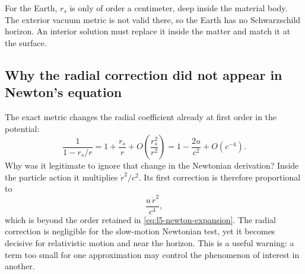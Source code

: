 \begin{classroomqa}
\end{classroomqa}

\begin{classroomqa}
\end{classroomqa}

For the Earth, \(r_s\) is only of order a centimeter, deep inside the material
body.  The exterior vacuum metric is not valid there, so the Earth has no
Schwarzschild horizon.  An interior solution must replace it inside the
matter and match it at the surface.

\begin{classroomqa}
\end{classroomqa}

\subsection{Why the radial correction did not appear in Newton's equation}

The exact metric changes the radial coefficient already at first order in the
potential:
\begin{equation}
\frac{1}{1-r_s/r}
=1+\frac{r_s}{r}
+O\!\left(\frac{r_s^2}{r^2}\right)
=1-\frac{2u}{c^2}+O(c^{-4}).
\label{eq:l5-radial-expansion}
\end{equation}
Why was it legitimate to ignore that change in the Newtonian derivation?
Inside the particle action it multiplies \(\dot r^2/c^2\).  Its first
correction is therefore proportional to
\begin{equation}
\frac{u\,\dot r^2}{c^4},
\end{equation}
which is beyond the order retained in
\eqref{eq:l5-newton-expansion}.  The radial correction is negligible for the
slow-motion Newtonian test, yet it becomes decisive for relativistic motion
and near the horizon.  This is a useful warning: a term too small for one
approximation may control the phenomenon of interest in another.

